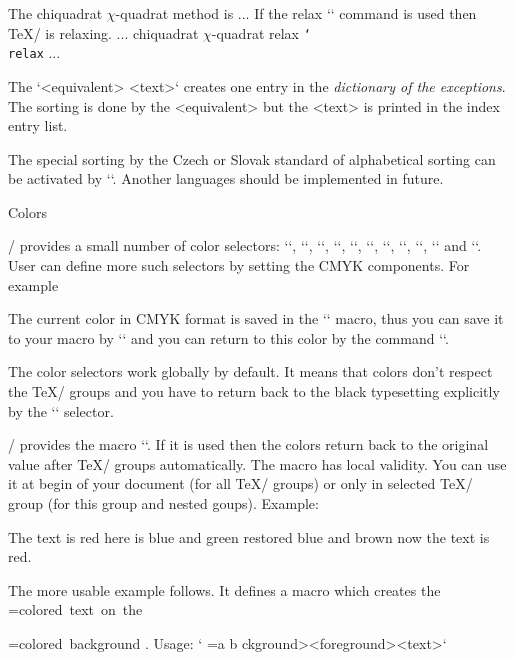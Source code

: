 \begtt
The \ii chiquadrat $\chi$-quadrat method is 
...
If the \ii relax `\relax` command is used then \TeX/ is relaxing.
...
\iis chiquadrat {$\chi$-quadrat}
\iis relax {{\tt \char`\\relax}}
...
\endtt

The `\iis <equivalent> {<text>}` creates one entry in the {\em dictionary 
of the exceptions}. The sorting is done by the <equivalent> but the
<text> is printed in the index entry list.

The special sorting by the Czech or Slovak standard of alphabetical sorting
can be activated by `\cssort`. Another languages should be implemented in
future.


\sec Colors

\OpTeX/ provides a small number of color selectors: 
{\localcolor\Blue `\Blue`}, 
{\localcolor\Red `\Red`}, 
{\localcolor\Brown `\Brown`},
{\localcolor\Green `\Green`}, 
{\localcolor\Yellow `\Yellow`}, 
{\localcolor\Cyan `\Cyan`}, 
{\localcolor\Magenta `\Magenta`}, 
{`\White`}, 
{\localcolor\Grey `\Grey`}, 
{\localcolor\LightGrey `\LightGrey`} and
`\Black`. User can define more
such selectors by setting the CMYK components. For example

\begtt
\def\Orange{\setcmykcolor{0 0.5 1 0}}
\endtt

The current color in CMYK format is saved in the `\currentcolor` macro, thus you
can save it to your macro  by `\let\yourmacro=\currentcolor` and you can return to
this color by the command `\setcmykcolor\yourmacro`.

The color selectors work globally by default. It means that colors don't
respect the \TeX/ groups and you have to return back to the black
typesetting explicitly by the `\Black` selector. 

\OpTeX/ provides the macro `\localcolor`. If it is used then the
colors return back to the original value after \TeX/ groups automatically.
The macro has local validity. You can use it at begin of your document 
(for all \TeX/ groups) or only in selected \TeX/ group (for this group 
and nested goups). Example:

\begtt
\Red The text is red
{\localcolor \Blue here is blue {\Green and green} 
             restored blue \Brown and brown}
now the text is red.
\endtt

\def\coloron#1#2#3{%
   \setbox0=\hbox{#3}\leavevmode
   {\localcolor\rlap{#1\strut \vrule width\wd0}#2\box0}%
}
The more usable example follows. It defines a macro which creates the
\coloron\Yellow\Brown{colored text on the} 
\coloron\Yellow\Brown{colored background}. Usage:
`\coloron<background><foreground>{<text>}`

